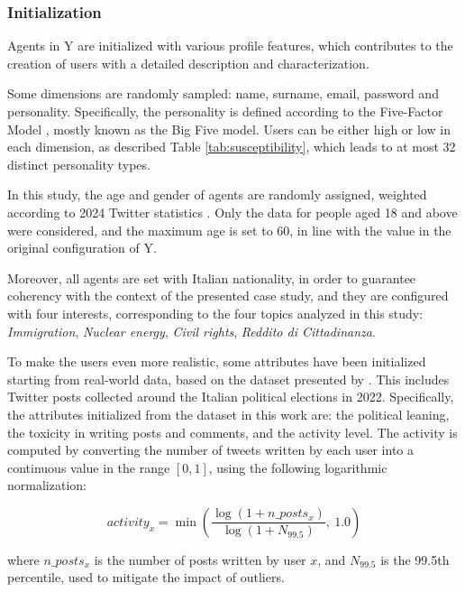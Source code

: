\subsubsection{Initialization}
Agents in Y are initialized with various profile features, which contributes to the creation of users with a detailed description and characterization.

Some dimensions are randomly sampled: name, surname, email, password and personality.
Specifically, the personality is defined according to the Five-Factor Model \cite{barrick1991bigfive, McCrae1992}, mostly known as the Big Five model. 
Users can be either high or low in each dimension, as described Table \ref{tab:susceptibility}, which leads to at most 32 distinct personality types.

\medskip
In this study, the age and gender of agents are randomly assigned, weighted according to 2024 Twitter statistics \cite{statista2024twitter}. Only the data for people aged 18 and above were considered, and the maximum age is set to 60, in line with the value in the original configuration of Y.

Moreover, all agents are set with Italian nationality, in order to guarantee coherency with the context of the presented case study, and they are configured with four interests, corresponding to the four topics analyzed in this study: \textit{Immigration}, \textit{Nuclear energy}, \textit{Civil rights}, \textit{Reddito di Cittadinanza}.

\medskip
To make the users even more realistic, some attributes have been initialized starting from real-world data, based on the dataset presented by \citet{pierri2023ita}. This includes Twitter posts collected around the Italian political elections in 2022.
Specifically, the attributes initialized from the dataset in this work are: the political leaning, the toxicity in writing posts and comments, and the activity level.
The activity is computed by converting the number of tweets written by each user into a continuous value in the range $[0,1]$, using the following logarithmic normalization:

\[
activity_x = \min\left( \frac{\log(1 + n\_posts_x)}{\log(1 + N_{99.5})},\ 1.0 \right)
\]

where $n\_posts_x$ is the number of posts written by user $x$, and $N_{99.5}$ is the 99.5th percentile, used to mitigate the impact of outliers.


